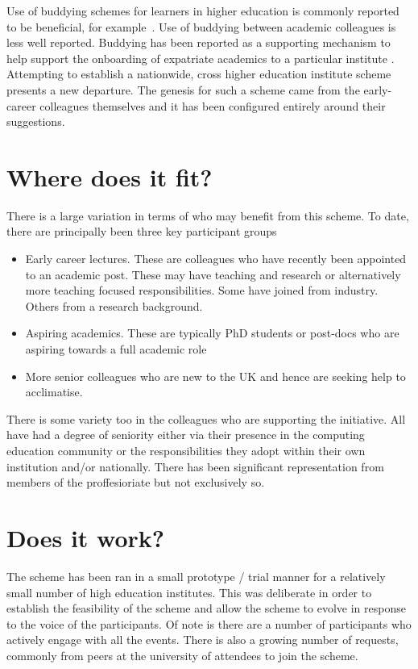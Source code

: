 \documentclass[sigconf]{acmart}
\begin{document}
Use of buddying schemes for learners in higher education is commonly reported to be beneficial, for example~\cite{Hayes2020,May20}. Use of buddying between academic colleagues is less well reported. Buddying has been reported as a supporting mechanism to help support the onboarding of expatriate academics to a particular institute \cite{Wilkins2019}. Attempting to establish a nationwide, cross higher education institute scheme presents a new departure. The genesis for such a scheme came from the early-career colleagues themselves and it has been configured entirely around their suggestions.
	
\section{Where does it fit?}
There is a large variation in terms of who may benefit from this scheme. To date, there are principally been three key participant groups
\begin{itemize}
	\item Early career lectures. These are colleagues who have recently been appointed to an academic post. These may have teaching and research or alternatively more teaching focused responsibilities. Some have joined from industry. Others from a research background.
	\item Aspiring academics. These are typically PhD students or post-docs who are aspiring towards a full academic role
	\item More senior colleagues who are new to the UK and hence are seeking help to acclimatise.
\end{itemize}

There is some variety too in the colleagues who are supporting the initiative. All have had a degree of seniority either via their presence in the computing education community or the responsibilities they adopt within their own institution and/or nationally. There has been significant representation from members of the proffesioriate but not exclusively so.





\section{Does it work?}	
\label{Sec:DoesItWork}
The scheme has been ran in a small prototype / trial manner for a relatively small number of high education institutes. This was deliberate in order to establish the feasibility of the scheme and allow the scheme to evolve in response to the voice of the participants. Of note is there are a number of participants who actively engage with all the events. There is also a growing number of requests, commonly from peers at the university of attendees to join the scheme.
\end{document}
